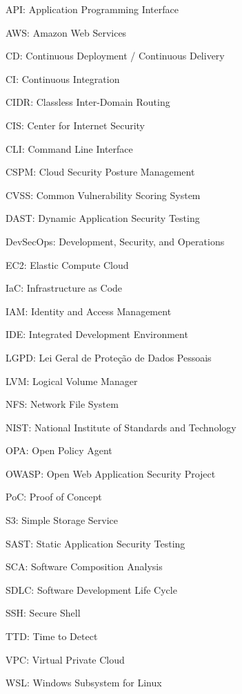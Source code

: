 \begin{siglas}
 \item API: Application Programming Interface
 \item AWS: Amazon Web Services
 \item CD: Continuous Deployment / Continuous Delivery
 \item CI: Continuous Integration
 \item CIDR: Classless Inter-Domain Routing
 \item CIS: Center for Internet Security
 \item CLI: Command Line Interface
 \item CSPM: Cloud Security Posture Management
 \item CVSS: Common Vulnerability Scoring System
 \item DAST: Dynamic Application Security Testing
 \item DevSecOps: Development, Security, and Operations
 \item EC2: Elastic Compute Cloud
 \item IaC: Infrastructure as Code
 \item IAM: Identity and Access Management
 \item IDE: Integrated Development Environment
 \item LGPD: Lei Geral de Proteção de Dados Pessoais
 \item LVM: Logical Volume Manager
 \item NFS: Network File System
 \item NIST: National Institute of Standards and Technology
 \item OPA: Open Policy Agent
 \item OWASP: Open Web Application Security Project
 \item PoC: Proof of Concept
 \item S3: Simple Storage Service
 \item SAST: Static Application Security Testing
 \item SCA: Software Composition Analysis
 \item SDLC: Software Development Life Cycle
 \item SSH: Secure Shell
 \item TTD: Time to Detect
 \item VPC: Virtual Private Cloud
 \item WSL: Windows Subsystem for Linux
\end{siglas}